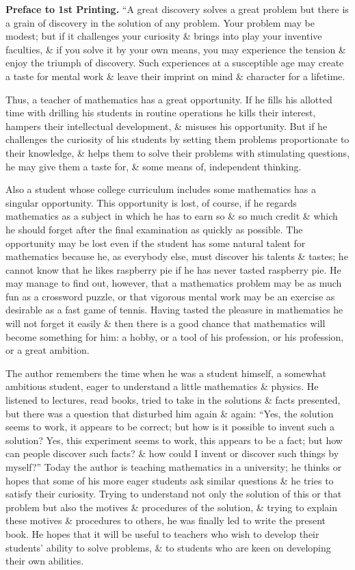 \documentclass{article}
\begin{document}
\begin{enumerate}
	{\bf Preface to 1st Printing.} ``A great discovery solves a great problem but there is a grain of discovery in the solution of any problem. Your problem may be modest; but if it challenges your curiosity \& brings into play your inventive faculties, \& if you solve it by your own means, you may experience the tension \& enjoy the triumph of discovery. Such experiences at a susceptible age may create a taste for mental work \& leave their imprint on mind \& character for a lifetime.

	Thus, a teacher of mathematics has a great opportunity. If he fills his allotted time with drilling his students in routine operations he kills their interest, hampers their intellectual development, \& misuses his opportunity. But if he challenges the curiosity of his students by setting them problems proportionate to their knowledge, \& helps them to solve their problems with stimulating questions, he may give them a taste for, \& some means of, independent thinking.

	Also a student whose college curriculum includes some mathematics has a singular opportunity. This opportunity is lost, of course, if he regards mathematics as a subject in which he has to earn so \& so much credit \& which he should forget after the final examination as quickly as possible. The opportunity may be lost even if the student has some natural talent for mathematics because he, as everybody else, must discover his talents \& tastes; he cannot know that he likes raspberry pie if he has never tasted raspberry pie. He may manage to find out, however, that a mathematics problem may be as much fun as a crossword puzzle, or that vigorous mental work may be an exercise as desirable as a fast game of tennis. Having tasted the pleasure in mathematics he will not forget it easily \& then there is a good chance that mathematics will become something for him: a hobby, or a tool of his profession, or his profession, or a great ambition.

	The author remembers the time when he was a student himself, a somewhat ambitious student, eager to understand a little mathematics \& physics. He listened to lectures, read books, tried to take in the solutions \& facts presented, but there was a question that disturbed him again \& again: ``Yes, the solution seems to work, it appears to be correct; but how is it possible to invent such a solution? Yes, this experiment seems to work, this appears to be a fact; but how can people discover such facts? \& how could I invent or discover such things by myself?'' Today the author is teaching mathematics in a university; he thinks or hopes that some of his more eager students ask similar questions \& he tries to satisfy their curiosity. Trying to understand not only the solution of  this or that problem but also the motives \& procedures of the solution, \& trying to explain these motives \& procedures to others, he was finally led to write the present book. He hopes that it will be useful to teachers who wish to develop their students' ability to solve problems, \& to students who are keen on developing their own abilities.


\end{enumerate}
\end{document}
